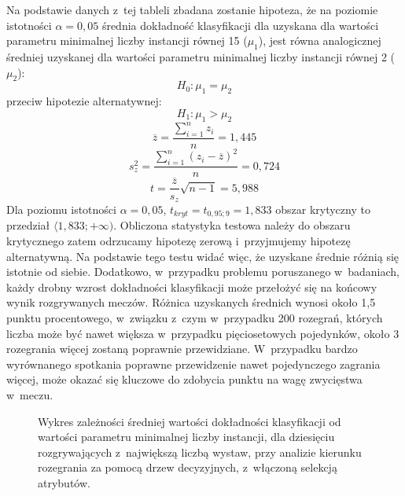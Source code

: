 \documentclass[a4paper,twoside,12pt]{book}
\begin{document}
Na podstawie danych z~tej tableli zbadana zostanie hipoteza, że na poziomie istotności $\alpha = 0,05$ średnia dokładność klasyfikacji dla uzyskana dla wartości parametru minimalnej liczby instancji równej 15 ($\mu_1$), jest równa analogicznej średniej uzyskanej dla wartości parametru minimalnej liczby instancji równej 2 ($\mu_2$):
\begin{equation}
H_{0}:\mu_1=\mu_2
\end{equation}
przeciw hipotezie alternatywnej:
\begin{equation}
H_{1}:\mu_1>\mu_2
\end{equation}
\begin{equation}
\overline{z} = \frac{\sum_{i=1}^{n}z_{i}}{n}=1,445
\end{equation}
\begin{equation}
s_{z}^{2}=\frac{\sum_{i=1}^{n}(z_{i}-\overline{z})^{2}}{n}=0,724
\end{equation}
\begin{equation}
t=\frac{\overline{z}}{s_z}\sqrt{n-1}=5,988
\end{equation}
Dla poziomu istotności $\alpha=0,05$, $t_{kryt}=t_{0,95;9}=1,833$ obszar krytyczny to przedział $\langle 1,833;+\infty)$. Obliczona statystyka testowa należy do obszaru krytycznego zatem odrzucamy hipotezę zerową i~przyjmujemy hipotezę alternatywną. Na podstawie tego testu widać więc, że uzyskane średnie różnią się istotnie od siebie. Dodatkowo, w~przypadku problemu poruszanego w~badaniach, każdy drobny wzrost dokładności klasyfikacji może przełożyć się na końcowy wynik rozgrywanych meczów. Różnica uzyskanych średnich wynosi około 1,5 punktu procentowego, w~związku z~czym w~przypadku 200 rozegrań, których liczba może być nawet większa w~przypadku pięciosetowych pojedynków, około 3 rozegrania więcej zostaną poprawnie przewidziane. W~przypadku bardzo wyrównanego spotkania poprawne przewidzenie nawet pojedynczego zagrania więcej, może okazać się kluczowe do zdobycia punktu na wagę zwycięstwa w~meczu.

\begin{figure}
\centering
{}
\caption{Wykres zależności średniej wartości dokładności klasyfikacji od wartości parametru minimalnej liczby instancji, dla dziesięciu rozgrywających z~największą liczbą wystaw, przy analizie kierunku rozegrania za pomocą drzew decyzyjnych, z~włączoną selekcją atrybutów.}
\label{fig:support-r-kierunek-auto}
\end{figure}
\end{document}
